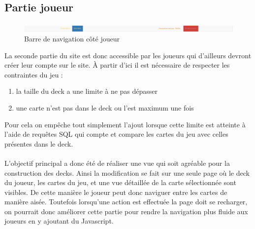 \documentclass[a4paper,11pt]{report}
\begin{document}
	\newpage

	\subsection{Partie joueur}
	\paragraph{}

	\begin{figure}[th]
      	 \begin{center}
          \includegraphics[scale=0.25]{Assets/navbar_joueur.png}
          \caption{Barre de navigation côté joueur}
          \label{RepTravail}
         \end{center}
        \end{figure}

      La seconde partie du site est donc accessible par les joueurs qui d'ailleurs devront créer leur compte sur le site. À partir d'ici il est nécessaire de respecter les contraintes du jeu : 

	\begin{enumerate}
		\item la taille du deck a une limite à ne pas dépasser
		\item une carte n'est pas dans le deck ou l'est maximum une fois
	\end{enumerate}Pour cela on empêche tout simplement l'ajout lorsque cette limite est atteinte à l'aide de requêtes SQL qui compte et compare les cartes du jeu avec celles présentes dans le deck.
	
	\paragraph{}
	L'objectif principal a donc été de réaliser une vue qui soit agréable pour la construction des decks. Ainsi la modification se fait sur une seule page où le deck du joueur, les cartes du jeu, et une vue détaillée de la carte sélectionnée sont visibles. De cette manière le joueur peut donc naviguer entre les cartes de manière aisée. Toutefois lorsqu'une action est effectuée la page doit se recharger, on pourrait donc améliorer cette partie pour rendre la navigation plus fluide aux joueurs en y ajoutant du Javascript.
\end{document}
